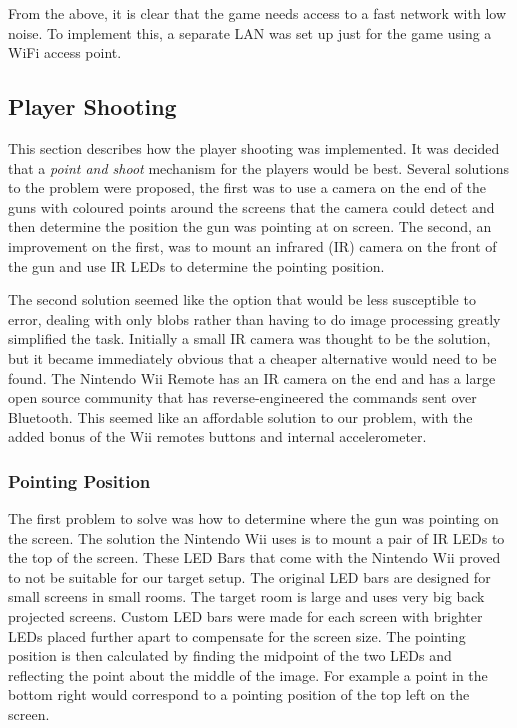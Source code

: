 \documentclass[a4paper,11pt]{article}
\begin{document}
From the above, it is clear that the game needs access to a fast network with low noise. To implement this, a separate LAN was set up just for the game using a WiFi access point.

\subsection{Player Shooting}

This section describes how the player shooting was implemented. It was decided that a \emph{point and shoot} mechanism for the players would be best. Several solutions to the problem were proposed, the first was to use a camera on the end of the guns with coloured points around the screens that the camera could detect and then determine the position the gun was pointing at on screen. The second, an improvement on the first, was to mount an infrared (IR) camera on the front of the gun and use IR LEDs to determine the pointing position. 

The second solution seemed like the option that would be less susceptible to error, dealing with only blobs rather than having to do image processing greatly simplified the task. Initially a small IR camera was thought to be the solution, but it became immediately obvious that a cheaper alternative would need to be found. The Nintendo Wii Remote \cite{wiibrew_wiimote} has an IR camera on the end and has a large open source community that has reverse-engineered the commands sent over Bluetooth. This seemed like an affordable solution to our problem, with the added bonus of the Wii remotes buttons and internal accelerometer. 

\subsubsection{Pointing Position}
The first problem to solve was how to determine where the gun was pointing on the screen. The solution the Nintendo Wii uses is to mount a pair of IR LEDs to the top of the screen. These LED Bars that come with the Nintendo Wii proved to not be suitable for our target setup. The original LED bars are designed for small screens in small rooms. The target room is large and uses very big back projected screens. Custom LED bars were made for each screen with brighter LEDs placed further apart to compensate for the screen size. The pointing position is then calculated by finding the midpoint of the two LEDs and reflecting the point about the middle of the image. For example a point in the bottom right would correspond to a pointing position of the top left on the screen. 
\end{document}
